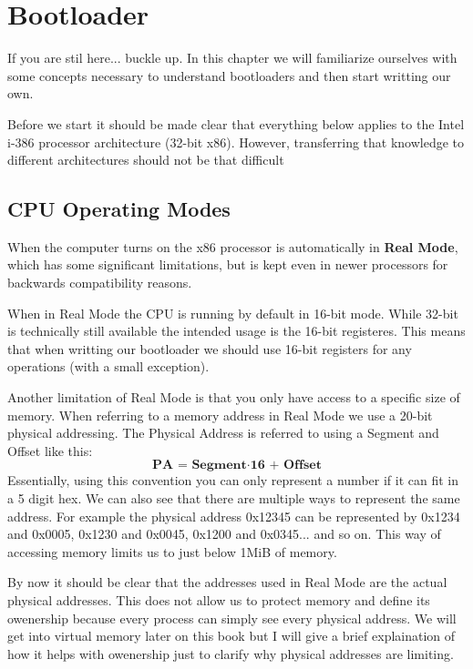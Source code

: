 \chapter{Bootloader}

If you are stil here... buckle up. In this chapter we will familiarize ourselves with some concepts necessary to understand bootloaders
and then start writting our own.

Before we start it should be made clear that everything below applies to the Intel i-386 processor architecture (32-bit x86).
However, transferring that knowledge to different architectures should not be that difficult

\section{CPU Operating Modes}

When the computer turns on the x86 processor is automatically in \textbf{Real Mode}, which has some significant limitations, but is
kept even in newer processors for backwards compatibility reasons. 

When in Real Mode the CPU is running by default in 16-bit mode. While 32-bit is technically still available the intended usage is the
16-bit registeres. This means that when writting our bootloader we should use 16-bit registers for any operations (with a small exception).

Another limitation of Real Mode is that you only have access to a specific size of memory. When referring to a memory address in Real Mode
we use a 20-bit physical addressing. The Physical Address is referred to using a Segment and Offset like this: 
\[
\textbf{PA = Segment} \cdot \textbf{16 + Offset}
\]
Essentially, using this convention you can only represent a number if it can fit in a 5 digit hex. We can also see that there are multiple
ways to represent the same address. For example the physical address 0x12345 can be represented by 0x1234 and 0x0005, 0x1230 and 0x0045,
0x1200 and 0x0345... and so on. This way of accessing memory limits us to just below 1MiB of memory.

By now it should be clear that the addresses used in Real Mode are the actual physical addresses. This does not allow us to protect 
memory and define its owenership because every process can simply see every physical address. We will get into virtual memory later
on this book but I will give a brief explaination of how it helps with owenership just to clarify why physical addresses are limiting.

